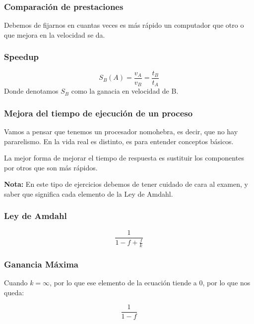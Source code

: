 \subsubsection{Comparación de prestaciones}

Debemos de fijarnos en cuantas veces es más rápido un computador que otro o que mejora en la velocidad se da.

\subsubsection{Speedup}

\begin{equation}
    S_B(A) = \frac{v_A}{v_B} = \frac{t_B}{t_A}
\end{equation}
Donde denotamos $S_B$ como la ganacia en velocidad de B.

\subsubsection{Mejora del tiempo de ejecución de un proceso}

Vamos a pensar que tenemos un procesador nomohebra, es decir, que no hay pararelismo. En la vida real es distinto, es para entender conceptos básicos.

La mejor forma de mejorar el tiempo de respuesta es sustituir los componentes por otros que son más rápidos.

\textbf{Nota:} En este tipo de ejercicios debemos de tener cuidado de cara al examen, y saber que significa cada elemento de la Ley de Amdahl.

\subsubsection{Ley de Amdahl}

\begin{equation}
    \frac{1}{1-f + \frac{f}{k}}
\end{equation}

\subsubsection{Ganancia Máxima}

Cuando $k=\infty$, por lo que ese elemento de la ecuación tiende a 0, por lo que nos queda:

\begin{equation}
    \frac{1}{1-f}
\end{equation}

